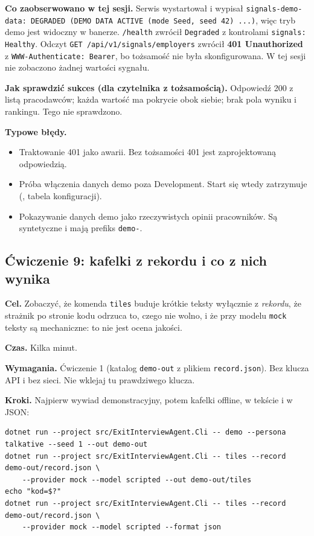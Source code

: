 {\textbf{Co zaobserwowano w tej sesji.} Serwis wystartował i wypisał
\texttt{signals-demo-data: DEGRADED (DEMO DATA ACTIVE (mode Seed, seed 42) ...)},
więc tryb demo jest widoczny w banerze. \texttt{/health} zwrócił \texttt{Degraded} z
kontrolami \texttt{signals: Healthy}. Odczyt \texttt{GET /api/v1/signals/employers}
zwrócił \textbf{401 Unauthorized} z \texttt{WWW-Authenticate: Bearer}, bo tożsamość nie
była skonfigurowana. W tej sesji nie zobaczono żadnej wartości sygnału.

\textbf{Jak sprawdzić sukces (dla czytelnika z tożsamością).} Odpowiedź 200 z listą
pracodawców; każda wartość ma pokrycie obok siebie; brak pola wyniku i rankingu.
Tego nie sprawdzono.

\textbf{Typowe błędy.}
\begin{itemize}[leftmargin=*,itemsep=1pt]
  \item Traktowanie 401 jako awarii. Bez tożsamości 401 jest zaprojektowaną odpowiedzią.
  \item Próba włączenia danych demo poza Development. Start się wtedy zatrzymuje
        (, tabela konfiguracji).
  \item Pokazywanie danych demo jako rzeczywistych opinii pracowników. Są syntetyczne
        i mają prefiks \texttt{demo-}.
\end{itemize}

\subsection{Ćwiczenie 9: kafelki z rekordu i co z nich wynika}\label{cw:kafelki}

\textbf{Cel.} Zobaczyć, że komenda \texttt{tiles} buduje krótkie teksty wyłącznie z
\emph{rekordu}, że strażnik po stronie kodu odrzuca to, czego nie wolno, i że
przy modelu \texttt{mock} teksty są mechaniczne: to nie jest ocena jakości.

\textbf{Czas.} Kilka minut.

\textbf{Wymagania.} Ćwiczenie 1 (katalog \texttt{demo-out} z plikiem \texttt{record.json}).
Bez klucza API i bez sieci. Nie wklejaj tu prawdziwego klucza.

\textbf{Kroki.} Najpierw wywiad demonstracyjny, potem kafelki offline, w tekście i w JSON:

\begin{Verbatim}[fontsize=\scriptsize,frame=single,framesep=2mm]
dotnet run --project src/ExitInterviewAgent.Cli -- demo --persona talkative --seed 1 --out demo-out
dotnet run --project src/ExitInterviewAgent.Cli -- tiles --record demo-out/record.json \
    --provider mock --model scripted --out demo-out/tiles
echo "kod=$?"
dotnet run --project src/ExitInterviewAgent.Cli -- tiles --record demo-out/record.json \
    --provider mock --model scripted --format json
\end{Verbatim}

}
